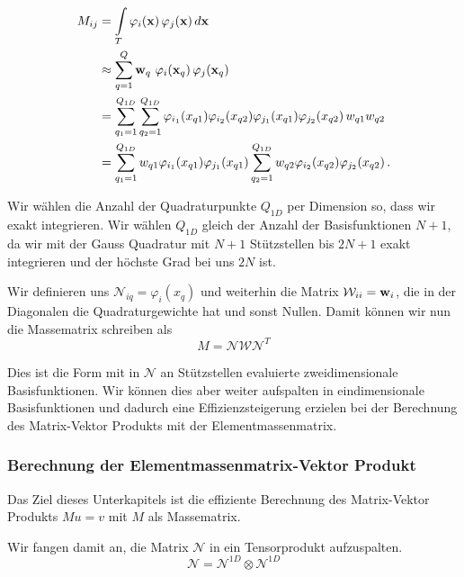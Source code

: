 \begin{equation} \label{eq:massapprox}
\begin{aligned}
M_{ij} &= \int\limits_{T} \varphi_i (\bold{x}) \, \varphi_j (\bold{x}) \, d\bold{x} \\
&\approx  \sum\limits_{q=1}^Q \bold{w}_q \, \, \varphi_i (\bold{x}_q) \, \varphi_j (\bold{x}_q) \\
&= \sum\limits_{q_1=1}^{Q_{1D}} \sum\limits_{q_2=1}^{Q_{1D}} \varphi_{i_1}(x_{q1}) \varphi_{i_2}(x_{q2}) \varphi_{j_1}(x_{q1}) \varphi_{j_2}(x_{q2}) \, w_{q1} w_{q2} \\ 
&= \sum\limits_{q_1=1}^{Q_{1D}} w_{q1} \varphi_{i_1}(x_{q1}) \varphi_{j_1}(x_{q1}) \sum\limits_{q_2=1}^{Q_{1D}} w_{q2} \varphi_{i_2}(x_{q2}) \varphi_{j_2}(x_{q2}) \, . 
\end{aligned}
\end{equation}

Wir wählen die Anzahl der Quadraturpunkte $Q_{1D}$ per Dimension so, dass wir exakt integrieren. Wir wählen $Q_{1D}$ gleich der Anzahl der Basisfunktionen $N+1$, da wir mit der Gauss Quadratur mit $N+1$ Stützstellen bis $2N+1$ exakt integrieren und der höchste Grad bei uns $2N$ ist.

Wir definieren uns $\mathcal{N}_{iq}=\varphi_i(x_q)$ und weiterhin die Matrix $\mathcal{W}_{ii}=\bold{w}_i$, die in der Diagonalen die Quadraturgewichte hat und sonst Nullen. Damit können wir nun die Massematrix schreiben als
\begin{equation}
M = \mathcal{N} \mathcal{W} \mathcal{N}^T
\end{equation}

Dies ist die Form mit in $\mathcal{N}$ an Stützstellen evaluierte zweidimensionale Basisfunktionen. Wir können dies aber weiter aufspalten in eindimensionale Basisfunktionen und dadurch eine Effizienzsteigerung erzielen bei der Berechnung des Matrix-Vektor Produkts mit der Elementmassenmatrix.
\subsubsection{Berechnung der Elementmassenmatrix-Vektor Produkt}

Das Ziel dieses Unterkapitels ist die effiziente Berechnung des Matrix-Vektor Produkts $Mu=v$ mit $M$ als Massematrix.

Wir fangen damit an, die Matrix $\mathcal{N}$ in ein Tensorprodukt aufzuspalten. 
\begin{equation} \label{eq:onedim}
\mathcal{N} = \mathcal{N}^{1D} \otimes \mathcal{N}^{1D}
\end{equation}


